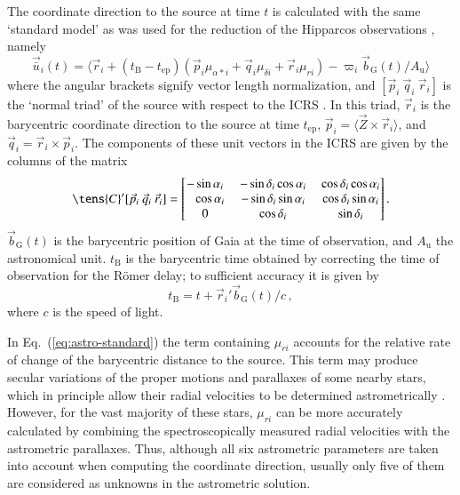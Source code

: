 \documentclass[structabstract]{aa}
\begin{document}
The coordinate direction to the source at time $t$ is calculated with the same
`standard model' as was used for the reduction of the Hipparcos observations
\citep[][Vol.~1, ~Sect.~1.2.8]{hip:catalogue}, namely
\begin{equation}\label{eq:astro-standard}
\vec{\bar{u}}_i(t) = \bigl\langle \vec{r}_i+(t_\text{B}-t_\text{ep})(\vec{p}_i\mu_{\alpha*i}
+\vec{q}_i\mu_{\delta i}+\vec{r}_i\mu_{ri})-\varpi_i\vec{b}_\text{G}(t)/A_\text{u} \bigr\rangle
\end{equation}
where the angular brackets signify vector length normalization, and
$[\vec{p}_i~\vec{q}_i~\vec{r}_i]$ is the `normal triad' of the source
with respect to the ICRS \citep{murray1983}. In this triad, 
$\vec{r}_i$ is the barycentric coordinate 
direction to the source at time $t_\text{ep}$, 
$\vec{p}_i=\langle\vec{Z}\times\vec{r}_i\rangle$, and 
$\vec{q}_i=\vec{r}_i\times\vec{p}_i$. The components of these unit vectors 
in the ICRS are given by the columns of the matrix
\begin{equation}\label{eq:normal-triad}
\tens{C}'[\vec{p}_i~\vec{q}_i~\vec{r}_i] = \begin{bmatrix} 
-\sin\alpha_i &~  -\sin\delta_i\cos\alpha_i  &~ \cos\delta_i\cos\alpha_i \\ 
\phantom{-}\cos\alpha_i &~  -\sin\delta_i\sin\alpha_i &~  \cos\delta_i\sin\alpha_i \\ 
0 &~  \cos\delta_i &~ \sin\delta_i \end{bmatrix}.
\end{equation}
$\vec{b}_\text{G}(t)$ is the barycentric position of Gaia at the time of
observation, and $A_\text{u}$ the astronomical unit. $t_\text{B}$ is the barycentric
time obtained by correcting the time of observation for the R{\"o}mer delay;
to sufficient accuracy it is given by
\begin{equation}\label{eq:roemer}
t_\text{B} = t + \vec{r}_i'\vec{b}_\text{G}(t)/c \, ,
\end{equation}
where $c$ is the speed of light.

In Eq.~(\ref{eq:astro-standard}) the term containing $\mu_{ri}$ accounts 
for the relative rate of change of the
barycentric distance to the source. This term may produce secular variations of
the proper motions and parallaxes of some nearby stars, which in principle allow
their radial velocities to be determined astrometrically \citep{drav+99}.
However, for the vast majority of these stars, $\mu_{ri}$ can be more accurately
calculated by combining the spectroscopically measured radial velocities with
the astrometric parallaxes. Thus, although all six astrometric parameters are
taken into account when computing the coordinate direction, usually only five 
of them are considered as unknowns in the astrometric solution.
\end{document}
